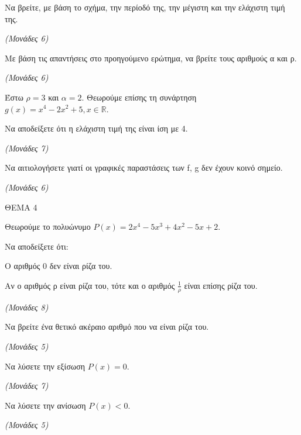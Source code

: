 \documentclass[11pt,a4paper,twoside]{book}
\newcommand{\monades}[1]{\hfill \textit{(Μονάδες #1)}}
\begin{document}
\begin{alist}
\item Να βρείτε, με βάση το σχήμα, την περίοδό της, την μέγιστη και την ελάχιστη τιμή της.

\monades{6}

\item Με βάση τις απαντήσεις στο προηγούμενο ερώτημα, να βρείτε τους αριθμούς α και ρ.

\monades{6}

Έστω $\rho = 3$ και $\alpha = 2$. Θεωρούμε επίσης τη συνάρτηση $g(x) = x^4 - 2x^2 + 5, x \in \mathbb{R}$.

\item Να αποδείξετε ότι η ελάχιστη τιμή της είναι ίση με 4.

\monades{7}

\item Να αιτιολογήσετε γιατί οι γραφικές παραστάσεις των f, g δεν έχουν κοινό σημείο.

\monades{6}
\end{alist}

\vspace{4mm}

ΘΕΜΑ 4

Θεωρούμε το πολυώνυμο $P(x) = 2x^4 - 5x^3 + 4x^2 - 5x + 2$.

\begin{alist}
\item Να αποδείξετε ότι:

\end{alist}
\begin{alist}
\item
  Ο αριθμός 0 δεν είναι ρίζα του.
\item
  Αν ο αριθμός ρ είναι ρίζα του, τότε και ο αριθμός $\frac{1}{\rho}$ είναι επίσης ρίζα του.

\monades{8}

\item Να βρείτε ένα θετικό ακέραιο αριθμό που να είναι ρίζα του.

\monades{5}

\item Να λύσετε την εξίσωση $P(x) = 0$.

\monades{7}

\item Να λύσετε την ανίσωση $P(x) < 0$.

\monades{5}
\end{alist}

\vspace{4mm}
\end{document}
